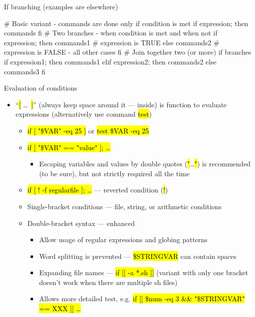 \documentclass[compress, ucs, xelatex, 11pt, xcolor=svgnames,
  hyperref={
    bookmarks=true,
    unicode=true,
    colorlinks=true,
    pdftitle={Linux, command line and MetaCentrum},
    plainpages=false,
    pdfauthor={Vojtech Zeisek},
    pdfsubject={Course about use of Linux command line, writing shell scripts and using MetaCentrum of CESNET},
    pdfcreator={XeLaTeX},
    pdfkeywords={Linux, GNU, BASH, shell, command line, MetaCentrum},
    linkcolor=DarkRed,
    anchorcolor=DarkBlue,
    citecolor=Indigo,
    filecolor=NavyBlue,
    menucolor=DarkMagenta,
    urlcolor=DarkBlue,
    pdftex},
  url={hyphens, lowtilde} %
  ]{beamer}
\renewcommand{\texttt}[1]{\hl{\ttfamily #1}}
\begin{document}
\begin{frame}[fragile]{If branching (examples are elsewhere)}
  \begin{bashcode}
    # Basic variant - commands are done only if condition is met
    if expression; then
        commands
      fi
    # Two branches - when condition is met and when not
    if expression; then
        commands1 # expression is TRUE
      else
        commands2 # expression is FALSE - all other cases
      fi
    # Join together two (or more) if branches
    if expression1; then
        commands1
      elif expression2; then
          commands2
        else
          commands3
        fi
  \end{bashcode}
\end{frame}

\begin{frame}[allowframebreaks]{Evaluation of conditions}
  \begin{itemize}
    \item ``\texttt{[} \ldots~\texttt{]}'' (always keep space around it --- inside) is function to evaluate expressions (alternatively use command \texttt{test})
    \begin{itemize}
      \item \texttt{if [ "\$VAR" -eq 25 ]} or \texttt{test \$VAR -eq 25}
      \item \texttt{if [ "\$VAR" == "value" ]; \ldots}
      \begin{itemize}
	\item Escaping variables and values by double quotes (\texttt{"}\ldots\texttt{"}) is recommended (to be sure), but not strictly required all the time
      \end{itemize}
      \item \texttt{if [ ! -f regularfile ]; \ldots} --- reverted condition (\texttt{!})
      \item Single-bracket conditions --- file, string, or arithmetic conditions
      \item Double-bracket syntax --- enhanced
      \begin{itemize}
	\item Allow usage of regular expressions and globing patterns
	\item Word splitting is prevented --- \texttt{\$STRINGVAR} can contain spaces
	\item Expanding file names --- \texttt{if [[ -a *.sh ]]} (variant with only one bracket doesn't work when there are multiple sh files)
	\item Allows more detailed test, e.g. \texttt{if [[ \$num -eq 3 \&\& "\$STRINGVAR" == XXX ]] \ldots}

\end{itemize}
\end{itemize}
\end{itemize}
\end{frame}
\end{document}
